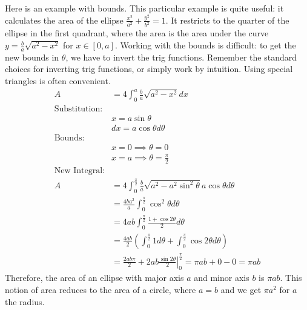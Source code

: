 \documentclass[fleqn]{report}
\begin{document}
\begin{example}
Here is an example with bounds. This particular example is
quite useful: it calculates the area of the ellipse
$\frac{x^2}{a^2} + \frac{y^2}{b^2} = 1$. It restricts
to the quarter of the ellipse in the first quadrant, where the
area is the area under the curve $y = \frac{b}{a}
\sqrt{a^2-x^2}$ for $x \in [0,a]$. Working with the bounds
is difficult: to get the new bounds in $\theta$, we have to
invert the trig functions. Remember the standard choices for
inverting trig functions, or simply work by intuition. Using
special triangles is often convenient.
\begin{align*}
A & = 4 \int_0^a \frac{b}{a} \sqrt{a^2-x^2} dx \\
\text{Substitution:} & \\
& x = a \sin \theta \\
& dx = a \cos \theta d \theta \\
\text{Bounds:} & \\
& x = 0 \implies \theta = 0 \\
& x = a \implies \theta = \frac{\pi}{2} \\
\text{New Integral:} & \\
A & = 4 \int_0^{\frac{\pi}{2}} \frac{b}{a} \sqrt{a^2 - a^2
\sin^2 \theta} a \cos \theta d \theta \\
& = \frac{4ba^2}{a} \int_0^{\frac{\pi}{2}} \cos^2 \theta
d\theta \\
& = 4ab \int_0^{\frac{\pi}{2}} \frac{1 + \cos 2\theta}{2}
d\theta \\
& = \frac{4ab}{2} \left( \int_0^{\frac{\pi}{2}} 1 d\theta
+ \int_0^{\frac{\pi}{2}} \cos 2\theta d\theta \right) \\
& = \frac{2ab\pi}{2} + \left. 2ab\frac{\sin 2\theta}{2}
\right|_0^{\frac{\pi}{2}} = \pi ab + 0 - 0 = \pi ab
\end{align*}
Therefore, the area of an ellipse with major axis $a$ and minor axis $b$
is $\pi ab$. This notion of area reduces to the area of a
circle, where $a=b$ and we get $\pi a^2$ for $a$ the radius.
\end{example}
\end{document}
